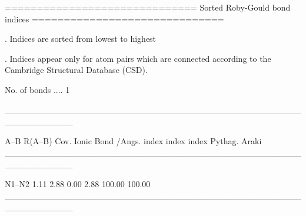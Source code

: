 
==============================
Sorted Roby-Gould bond indices
==============================

. Indices are sorted from lowest to highest

. Indices appear only for atom pairs which are connected
  according to the Cambridge Structural Database (CSD).

No. of bonds .... 1

___________________________________________________________

   A--B     R(A--B)    Cov.   Ionic   Bond    %
             /Angs.   index   index  index  Pythag.   Araki
___________________________________________________________

  N1--N2       1.11    2.88    0.00   2.88   100.00  100.00
___________________________________________________________
